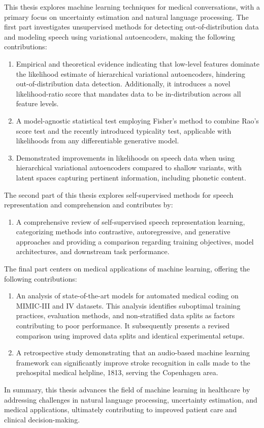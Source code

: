 This thesis explores machine learning techniques for medical conversations, with a primary focus on uncertainty estimation and natural language processing. The first part investigates unsupervised methods for detecting out-of-distribution data and modeling speech using variational autoencoders, making the following contributions:
%
\begin{enumerate}[label=(\roman*)] 
    \item Empirical and theoretical evidence indicating that low-level features dominate the likelihood estimate of hierarchical variational autoencoders, hindering out-of-distribution data detection. Additionally, it introduces a novel likelihood-ratio score that mandates data to be in-distribution across all feature levels.
    \item A model-agnostic statistical test employing Fisher's method to combine Rao's score test and the recently introduced typicality test, applicable with likelihoods from any differentiable generative model.
    \item Demonstrated improvements in likelihoods on speech data when using hierarchical variational autoencoders compared to shallow variants, with latent spaces capturing pertinent information, including phonetic content.
\end{enumerate}
%
The second part of this thesis explores self-supervised methods for speech representation and comprehension and contributes by:
%
\begin{enumerate}[resume, label=(\roman*)] 
    \item A comprehensive review of self-supervised speech representation learning, categorizing methods into contrastive, autoregressive, and generative approaches and providing a comparison regarding training objectives, model architectures, and downstream task performance.
\end{enumerate}
%
The final part centers on medical applications of machine learning, offering the following contributions:
%
\begin{enumerate}[resume, label=(\roman*)] 
    \item An analysis of state-of-the-art models for automated medical coding on MIMIC-III and IV datasets. This analysis identifies suboptimal training practices, evaluation methods, and non-stratified data splits as factors contributing to poor performance. It subsequently presents a revised comparison using improved data splits and identical experimental setups.
    \item A retrospective study demonstrating that an audio-based machine learning framework can significantly improve stroke recognition in calls made to the prehospital medical helpline, 1813, serving the Copenhagen area.
\end{enumerate}
%
In summary, this thesis advances the field of machine learning in healthcare by addressing challenges in natural language processing, uncertainty estimation, and medical applications, ultimately contributing to improved patient care and clinical decision-making.